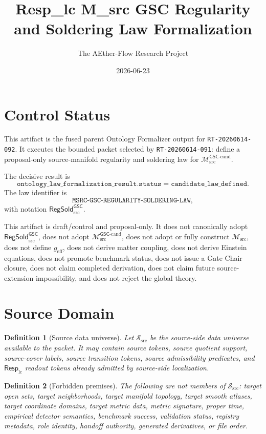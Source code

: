 \documentclass[11pt]{article}
\title{Resp\_lc M\_src GSC Regularity and Soldering Law Formalization}
\author{The AEther-Flow Research Project}
\date{2026-06-23}
\newcommand{\RespLC}{\mathsf{Resp}_{\mathrm{lc}}}
\newcommand{\Msrc}{\mathcal{M}_{\mathrm{src}}}
\newcommand{\Mgsccand}{\mathcal{M}_{\mathrm{src}}^{\mathsf{GSC}\text{-}\mathrm{cand}}}
\newcommand{\geff}{g_{\mathrm{eff}}}
\newcommand{\RegSold}{\mathsf{RegSold}_{\mathrm{src}}^{\mathsf{GSC}}}
\newtheorem{definition}{Definition}
\begin{document}
\maketitle

\section*{Control Status}

This artifact is the fused parent Ontology Formalizer output for
\texttt{RT-20260614-092}. It executes the bounded packet selected by
\texttt{RT-20260614-091}: define a proposal-only source-manifold regularity
and soldering law for \(\Mgsccand\).

The decisive result is
\[
  \texttt{ontology\_law\_formalization\_result.status}
  =
  \texttt{candidate\_law\_defined}.
\]
The law identifier is
\[
  \texttt{MSRC-GSC-REGULARITY-SOLDERING-LAW},
\]
with notation \(\RegSold\).

This artifact is draft/control and proposal-only. It does not canonically
adopt \(\RegSold\), does not adopt \(\Mgsccand\), does not adopt or fully
construct \(\Msrc\), does not define \(\geff\), does not derive matter
coupling, does not derive Einstein equations, does not promote benchmark
status, does not issue a Gate Chair closure, does not claim completed
derivation, does not claim future source-extension impossibility, and does
not reject the global theory.

\section{Source Domain}

\begin{definition}[Source data universe]
Let \(\mathcal{S}_{\mathrm{src}}\) be the source-side data universe available
to the packet. It may contain source tokens, source quotient support,
source-cover labels, source transition tokens, source admissibility
predicates, and \(\RespLC\) readout tokens already admitted by source-side
localization.
\end{definition}

\begin{definition}[Forbidden premises]
The following are not members of \(\mathcal{S}_{\mathrm{src}}\): target open
sets, target neighborhoods, target manifold topology, target smooth atlases,
target coordinate domains, target metric data, metric signature, proper time,
empirical detector semantics, benchmark success, validation status, registry
metadata, role identity, handoff authority, generated derivatives, or file
order.
\end{definition}
\end{document}

